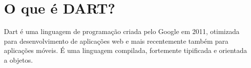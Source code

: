 \section{O que é DART?}
\label{sec:whatisdart}
Dart é uma linguagem de programação criada pelo Google em 2011, 
otimizada para desenvolvimento de aplicações web e mais 
recentemente também para aplicações móveis. É uma linguagem compilada, 
fortemente tipificada e orientada a objetos.  

